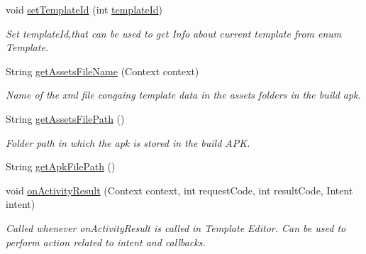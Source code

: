 \begin{DoxyCompactItemize}
void \hyperlink{classorg_1_1buildmlearn_1_1toolkit_1_1templates_1_1DictationTemplate_a84d3d92657a1912cac61fa57083442e0}{set\+Template\+Id} (int \hyperlink{classorg_1_1buildmlearn_1_1toolkit_1_1templates_1_1DictationTemplate_a4ad8d52a9cf5c27a33391d252a0fae02}{template\+Id})
\begin{DoxyCompactList}\small\item\em Set template\+Id,that can be used to get Info about current template from enum Template. \end{DoxyCompactList}\item 
String \hyperlink{classorg_1_1buildmlearn_1_1toolkit_1_1templates_1_1DictationTemplate_abfa521c667d14453bd07ae5b5ae7fd72}{get\+Assets\+File\+Name} (Context context)
\begin{DoxyCompactList}\small\item\em Name of the xml file congaing template data in the assets folders in the build apk. \end{DoxyCompactList}\item 
String \hyperlink{classorg_1_1buildmlearn_1_1toolkit_1_1templates_1_1DictationTemplate_a554ecf0f0211f53853d23f3519f211dd}{get\+Assets\+File\+Path} ()
\begin{DoxyCompactList}\small\item\em Folder path in which the apk is stored in the build A\+PK. \end{DoxyCompactList}\item 
String \hyperlink{classorg_1_1buildmlearn_1_1toolkit_1_1templates_1_1DictationTemplate_a8586e954d6d42d8aed5da1fe3b395619}{get\+Apk\+File\+Path} ()
\item 
void \hyperlink{classorg_1_1buildmlearn_1_1toolkit_1_1templates_1_1DictationTemplate_ad25ce129ca416032df3d17539cfb0b06}{on\+Activity\+Result} (Context context, int request\+Code, int result\+Code, Intent intent)
\begin{DoxyCompactList}\small\item\em Called whenever on\+Activity\+Result is called in Template Editor. Can be used to perform action related to intent and callbacks. \end{DoxyCompactList}\end{DoxyCompactItemize}

